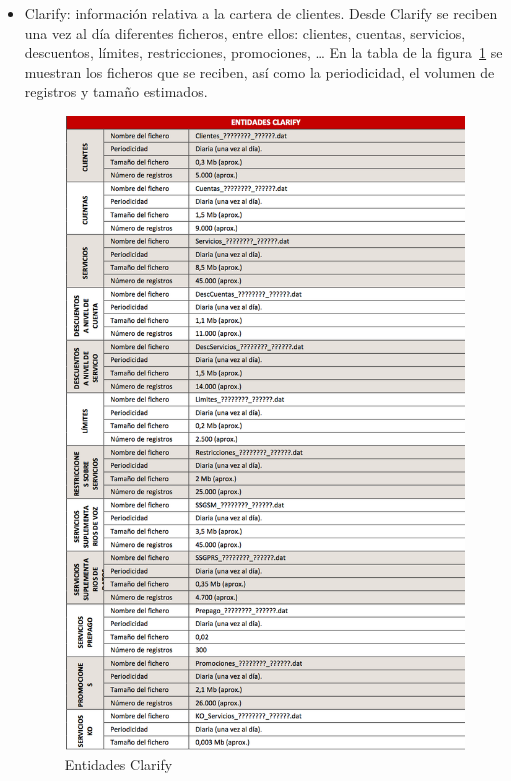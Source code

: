 \documentclass[a4paper, 12pt]{book}
\begin{document}
\begin{itemize}
	\item Clarify: información relativa a la cartera de clientes. Desde Clarify se reciben una vez al día diferentes ficheros, entre ellos: clientes, cuentas, servicios, descuentos, límites, restricciones, promociones, … En la tabla de la figura~\ref{fig:entidades1} se muestran los ficheros que se reciben, así como la periodicidad, el volumen de registros y tamaño estimados.

	\begin{figure}
	  \centering
	  \includegraphics[width=14cm, keepaspectratio]{img/entidades1}
	  \caption{Entidades Clarify}
	  \label{fig:entidades1}
	\end{figure}
	

\end{itemize}
\end{document}
